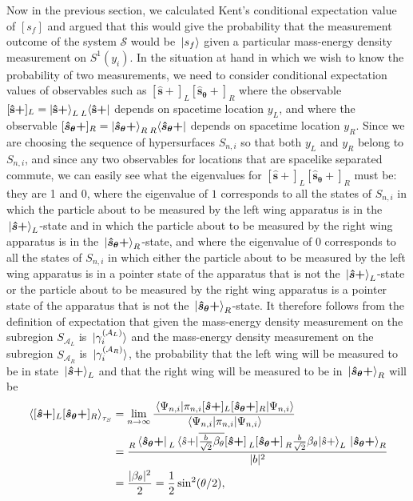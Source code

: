Now in the previous section, we calculated Kent's conditional expectation value of $[s_f]$ and argued that this would give the probability that the measurement outcome of the system $\mathcal{S}$ would be $\ket*{s_f}$ given a particular mass-energy density measurement on $S^1(y_i)$. In the situation at hand in which we wish to know the probability of two measurements, we need to consider conditional expectation values of observables such as  $[\bm{\hat{s}+}]_L[\bm{\hat{s}_\theta+}]_R$ where the observable $[{\vb{\hat{{s}}}\bm{+}}]_L=\ket{{\vb{\hat{{s}}}\bm{+}}}_L\prescript{}{L}{\bra{{\vb{\hat{{s}}}\bm{+}}}}$ depends on spacetime location $y_L$, and where the observable $[\bm{\hat{s}_\theta+}]_R=\ket{\bm{\hat{s}_\theta+}}_R\prescript{}{R}{\bra{\bm{\hat{s}_\theta+}}}$ 
%
depends on spacetime location $y_R.$ Since we are choosing the sequence of hypersurfaces $S_{n,i}$ so that both $y_L$ and $y_R$ belong to $S_{n,i}$, and since any two observables for locations that are spacelike separated commute, we can easily see what the eigenvalues for  $[\bm{\hat{s}+}]_L[\bm{\hat{s}_\theta+}]_R$ must be: they are 1 and 0, where the eigenvalue of $1$ corresponds to all the states of $S_{n,i}$ in which the particle about to be measured by the left wing apparatus is in the $\ket*{\bm{\hat{s}+}}_L$-state and in which the particle about to be measured by the right wing apparatus is in the $\ket*{\bm{\hat{s}_\theta+}}_R$-state, and where the eigenvalue of $0$ corresponds to all the states of $S_{n,i}$ in which either the particle about to be measured by the left wing apparatus is in a pointer state of the apparatus that is not the $\ket*{\bm{\hat{s}+}}_L$-state or the particle about to be measured by the right wing apparatus is a pointer state of the apparatus that is not the $\ket*{\bm{\hat{s}_\theta+}}_R$-state. It therefore follows from the definition of expectation that given the mass-energy density measurement on the subregion $S_{\mathcal{A}_L}$ is $\ket*{\gamma_i^{(\mathcal{A}_L)}}$ and the mass-energy density measurement on the subregion $S_{\mathcal{A}_R}$ is $\ket*{\gamma_i^{(\mathcal{A}_R)}}$, the probability that the left wing will be measured to be in state  $\ket*{\bm{\hat{s}+}}_L$ and that the right wing will be measured to be in $\ket*{\bm{\hat{s}_\theta+}}_R$ will be
\begin{equation}\label{slsrev}
	\begin{split}
	\ev*{[\bm{\hat{s}+}]_L[\bm{\hat{s}_\theta+}]_R}_{\tau_S}
	&=\lim_{n\rightarrow\infty}\frac{\ev*{\pi_{n,i}[\bm{\hat{s}+}]_L[\bm{\hat{s}_\theta+}]_R}{\Psi_{n,i}}}{\ev*{\pi_{n,i}}{\Psi_{n,i}}}\\
	&=\frac{\prescript{}{R}{\bra*{\bm{\hat{s}_\theta+}}}\prescript{}{L}{}\ev*{\overline{\frac{b}{\sqrt{2}}\beta_{\theta}}[\bm{\hat{s}+}]\prescript{}{L}{}[\bm{\hat{s}_\theta+}]\prescript{}{R}{}\frac{b}{\sqrt{2}}\beta_{\theta}}{\hat{s}+}_L\ket*{\bm{\hat{s}_\theta+}}_R}{|b|^2}\\
	&=\frac{|\beta_\theta|^2}{2}=\frac{1}{2}\sin^2(\theta/2),
	\end{split}	
\end{equation}
